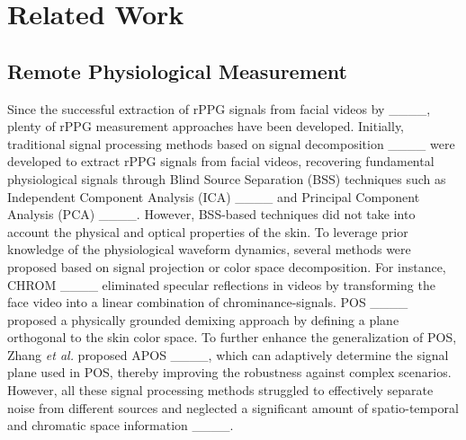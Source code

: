 \section{Related Work}
\subsection{Remote Physiological Measurement}
\label{subsec:physiological_measurement}

Since the successful extraction of rPPG signals from facial videos by ____, plenty of rPPG measurement approaches have been developed. Initially, traditional signal processing methods based on signal decomposition ____ were developed to extract rPPG signals from facial videos, recovering fundamental physiological signals through Blind Source Separation (BSS) techniques such as Independent Component Analysis (ICA) ____ and Principal Component Analysis (PCA) ____. However, BSS-based techniques did not take into account the physical and optical properties of the skin. To leverage prior knowledge of the physiological waveform dynamics, several methods were proposed based on signal projection or color space decomposition. For instance, CHROM ____ eliminated specular reflections in videos by transforming the face video into a linear combination of chrominance-signals. POS ____ proposed a physically grounded demixing approach by defining a plane orthogonal to the skin color space. To further enhance the generalization of POS, Zhang \textit{et al.} proposed APOS ____, which can adaptively determine the signal plane used in POS, thereby improving the robustness against complex scenarios. However, all these signal processing methods struggled to effectively separate noise from different sources and neglected a significant amount of spatio-temporal and chromatic space information ____. 

